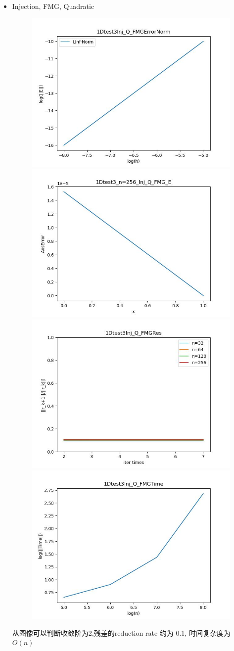 \documentclass{article}
\begin{document}
\begin{itemize}
    \item Injection, FMG, Quadratic
    \begin{figure}[h]
        \centering
        \includegraphics[width=0.35\linewidth]{1Dtest3Inj_Q_FMGErrorNorm.jpg}
        \includegraphics[width=0.35\linewidth]{1Dtest3_n=256_Inj_Q_FMG_E.jpg}
        \includegraphics[width=0.35\linewidth]{1Dtest3Inj_Q_FMGRes.jpg}
        \includegraphics[width=0.35\linewidth]{1Dtest3Inj_Q_FMGTime.jpg}
    \end{figure}
    
    从图像可以判断收敛阶为2,残差的reduction rate 约为 0.1, 时间复杂度为$O(n)$
    \newpage


\end{itemize}
\end{document}
